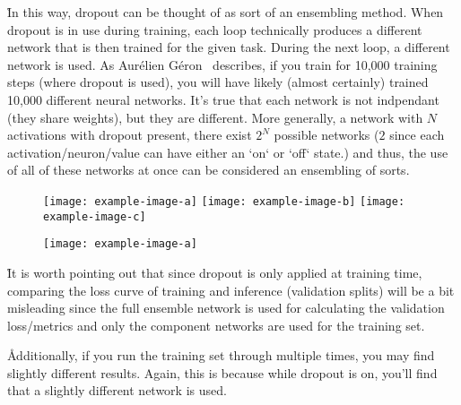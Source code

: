 \r{In this way, dropout can be thought of as sort of an ensembling method. When dropout is in use during training, each loop technically produces a different network that is then trained for the given task. During the next loop, a different network is used. As Aurélien Géron~\cite{geron2019hands} describes, if you train for 10,000 training steps (where dropout is used), you will have likely (almost certainly) trained 10,000 different neural networks. It's true that each network is not indpendant (they share weights), but they are different. More generally, a network with $N$ activations with dropout present, there exist $2^N$ possible networks ($2$ since each activation/neuron/value can have either an `on` or `off` state.) and thus, the use of all of these networks at once can be considered an ensembling of sorts.}




\begin{figure}[htp]
	\centering
	\texttt{[image: example-image-a]}\hfil
	\texttt{[image: example-image-b]}\hfil
	\texttt{[image: example-image-c]}\hfil
	\caption{}
	\label{fig:regularization_dropout_overview_training}
\end{figure}

\begin{figure}[htp]
	\centering
	\texttt{[image: example-image-a]}\hfil
	\caption{}
	\label{fig:regularization_dropout_overview_test}
\end{figure}

\r{It is worth pointing out that since dropout is only applied at training time, comparing the loss curve of training and inference (validation splits) will be a bit misleading since the full ensemble network is used for calculating the validation loss/metrics and only the component  networks are used for the training set.}

\r{Additionally, if you run the training set through multiple times, you may find slightly different results. Again, this is because while dropout is on, you'll find that a slightly different network is used. }

